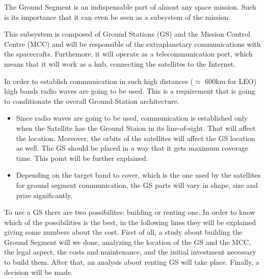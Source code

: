 The Ground Segment is an indispensable part of almost any space mission. Such is its importance that it can even be seen as a subsystem of the mission.

This subsystem is composed of Ground Stations (GS) and the Mission Control Centre (MCC) and will be responsible of the extraplanetary communications with the spacecrafts. Furthemore, it will operate as a telecommunication port, which means that it will work as a hub, connecting the satellites to the Internet.

In order to establish communication in such high distances ($\approx$ 600km for LEO) high bands radio waves are going to be used. This is a requirement that is going to conditionate the overall Ground Station architecture.
\begin{itemize}
\item Since radio waves are going to be used, communication is established only when the Satellite has the Ground Staion in its line-of-sight. That will affect the location. Moreover, the orbits of the satellites will affect the GS location as well. The GS should be placed in a way that it gets maximum coverage time. This point will be further explained.
\item Depending on the target band to cover, which is the one used by the satellites for ground segment communication, the GS parts will vary in shape, size and prize significantly.
\end{itemize}

To use a GS there are two possibilites: building or renting one. In order to know which of the possibilities is the best, in the following lines they will be explained giving some numbers about the cost. First of all, a study about building the Ground Segment will we done, analyzing the location of the GS and the MCC, the legal aspect, the costs and maintenance, and the initial investment necessary to build them. After that, an analysis about renting GS will take place. Finally, a decision will be made.